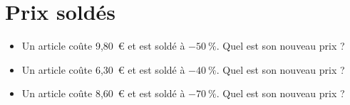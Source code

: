 \documentclass[a4paper,11pt,fleqn]{article}
\begin{document}
\section{Prix soldés}
\begin{itemize}

  \item Un article coûte 9,80~€ et est soldé à $-50~\%$. Quel est son nouveau prix ?
  \item Un article coûte 6,30~€ et est soldé à $-40~\%$. Quel est son nouveau prix ?
  \item Un article coûte 8,60~€ et est soldé à $-70~\%$. Quel est son nouveau prix ?
\end{itemize}
\end{document}
